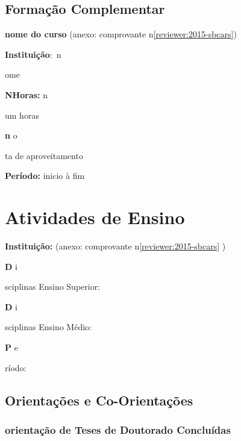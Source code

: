 \documentclass[a4paper,oneside,12pt]{article}
\newcommand{\SubItemB}[2]{
    {\setlength\itemindent{15pt} \item[-] \textbf{#1} {#2}}}
\newcommand{\Instituicao}[1]{
    {\setlength\itemindent{15pt} \item[-] {\textbf{Instituição$:$} #1}}}
\newcommand{\Duracao}[1]{
    {\setlength\itemindent{15pt} \item[-] \textbf{N\degree  Horas:} {#1}}}
\newcommand{\Periodo}[2]{
    {\setlength\itemindent{15pt} \item[-] \textbf{Período:} #1 à #2} }
\newcounter{document}%
\begin{document}
\subsection{Formação Complementar}
\begin{enumerate}
\renewcommand{\labelenumi}{{\large\bfseries\arabic{enumi}.}}
    \item \textbf{nome do curso} (anexo: comprovante n\degree \ref{reviewer:2015-sbcars})
        \Instituicao nome 
        \Duracao num horas 
        \SubItemB nota de aproveitamento 
        \Periodo{inicio}{fim} 
\end{enumerate}

\newpage
\section{Atividades de Ensino}
\vspace{0.3cm}

\begin{enumerate}
    \item \textbf{Instituição: } (anexo: comprovante n\degree \ref{reviewer:2015-sbcars} )
        \SubItemB Disciplinas Ensino Superior:
        \SubItemB Disciplinas Ensino Médio:
        \SubItemB Período:  
\end{enumerate}



\subsection{Orientações e Co-Orientações}
\vspace{0.3cm}

\subsubsection{orientação de Teses de Doutorado Concluídas}
\vspace{0.3cm}
\end{document}
